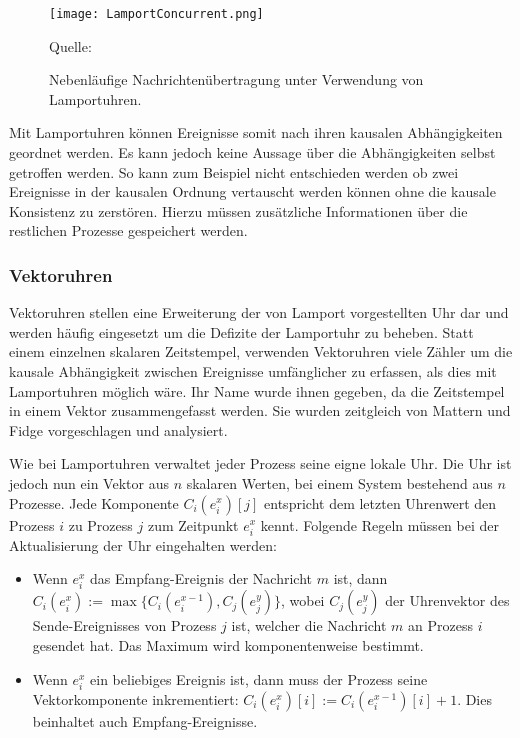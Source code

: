 \begin{figure}[ht]
    \centering
    \texttt{[image: LamportConcurrent.png]}
    \caption[Lamportuhren und Kausalität]{Nebenläufige Nachrichtenübertragung unter Verwendung von Lamportuhren.}
    Quelle: \cite{tanenbaum2007distributed}
    \label{fig:LamportConcurrent}
\end{figure}

Mit Lamportuhren können Ereignisse somit nach ihren kausalen Abhängigkeiten geordnet werden.
Es kann jedoch keine Aussage über die Abhängigkeiten selbst getroffen werden.
So kann zum Beispiel nicht entschieden werden ob zwei Ereignisse in der kausalen Ordnung vertauscht werden können ohne die kausale Konsistenz zu zerstören.
Hierzu müssen zusätzliche Informationen über die restlichen Prozesse gespeichert werden.

\subsubsection{Vektoruhren}
Vektoruhren stellen eine Erweiterung der von Lamport vorgestellten Uhr dar und werden häufig eingesetzt um die Defizite der Lamportuhr zu beheben.
Statt einem einzelnen skalaren Zeitstempel, verwenden Vektoruhren viele Zähler um die kausale Abhängigkeit zwischen Ereignisse umfänglicher zu erfassen, als dies mit Lamportuhren möglich wäre.
Ihr Name wurde ihnen gegeben, da die Zeitstempel in einem Vektor zusammengefasst werden.
Sie wurden zeitgleich von Mattern \cite{bibid} und Fidge \cite{bibid} vorgeschlagen und analysiert.

Wie bei Lamportuhren verwaltet jeder Prozess seine eigne lokale Uhr.
Die Uhr ist jedoch nun ein Vektor aus $n$ skalaren Werten, bei einem System bestehend aus $n$ Prozesse.
Jede Komponente $C_i(e_i^x)[j]$ entspricht dem letzten Uhrenwert den Prozess $i$ zu Prozess $j$ zum Zeitpunkt $e_i^x$ kennt.
Folgende Regeln müssen bei der Aktualisierung der Uhr eingehalten werden:
\begin{itemize}
    \item Wenn $e_i^x$ das Empfang-Ereignis der Nachricht $m$ ist, dann $C_i(e_i^x):=\max\{ C_i(e_i^{x-1}), C_j(e_j^y) \}$, wobei $C_j(e_j^y)$ der Uhrenvektor des Sende-Ereignisses von Prozess $j$ ist, welcher die Nachricht $m$ an Prozess $i$ gesendet hat. Das Maximum wird komponentenweise bestimmt.
    \item Wenn $e_i^x$ ein beliebiges Ereignis ist, dann muss der Prozess seine Vektorkomponente inkrementiert: $C_i(e_i^x)[i]:=C_i(e_i^{x-1})[i] + 1$. Dies beinhaltet auch Empfang-Ereignisse.
\end{itemize}

